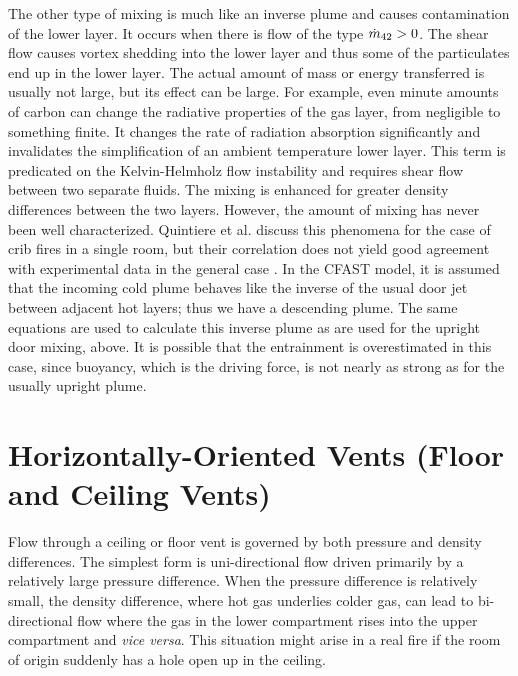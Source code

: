 The other type of mixing is much like an inverse plume and causes contamination of the lower layer.  It occurs when there is flow of the type $\dot{m}_{42} > 0$.  The shear flow causes vortex shedding into the lower layer and thus some of the particulates end up in the lower layer.  The actual amount of mass or energy transferred is usually not large, but its effect can be large.  For example, even minute amounts of carbon can change the radiative properties of the gas layer, from negligible to something finite.  It changes the rate of radiation absorption significantly and invalidates the simplification of an ambient temperature lower layer.  This term is predicated on the Kelvin-Helmholz flow instability and requires shear flow between two separate fluids.  The mixing is enhanced for greater density differences between the two layers. However, the amount of mixing has never been well characterized. Quintiere et al. \cite{Quintiere:1984} discuss this phenomena for the case of crib fires in a single room, but their correlation does not yield good agreement with experimental data in the general case \cite{Quintiere:1981}.  In the CFAST model, it is assumed that the incoming cold plume behaves like the inverse of the usual door jet between adjacent hot layers; thus we have a descending plume.  The same equations are used to calculate this inverse plume as are used for the upright door mixing, above. It is possible that the entrainment is overestimated in this case, since buoyancy, which is the driving force, is not nearly as strong as for the usually upright plume.

\section{Horizontally-Oriented Vents (Floor and Ceiling Vents)}

Flow through a ceiling or floor vent is governed by both pressure and density differences. The simplest form is uni-directional flow driven primarily by a relatively large pressure difference. When the pressure difference is relatively small, the density difference, where hot gas underlies colder gas, can lead to bi-directional flow where the gas in the lower compartment rises into the upper compartment and {\em vice versa}.  This situation might arise in a real fire if the room of origin suddenly has a hole open up in the ceiling. 

